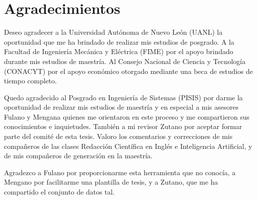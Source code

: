 
\chapter{Agradecimientos}


Deseo agradecer a la Universidad Autónoma de Nuevo León (UANL) la oportunidad que me ha brindado de realizar mis estudios de posgrado. A la Facultad de Ingeniería Mecánica y Eléctrica (FIME) por el apoyo brindado durante mis estudios de maestría. Al Consejo Nacional de Ciencia y Tecnología (CONACYT) por el apoyo e\-co\-nó\-mi\-co otorgado mediante una beca de estudios de tiempo completo.

Quedo agradecido al Posgrado en Ingeniería de Sistemas (PISIS) por darme la oportunidad de realizar mis estudios de maestría y en especial a mis asesores Fulano y Mengana quienes me orientaron en este proceso y me compartieron sus conocimientos e inquietudes. También a mi revisor Zutano por aceptar formar parte del comité de esta tesis. Valoro los comentarios y correcciones de mis compañeros de las clases Redacción Científica en Inglés e Inteligencia Artificial, y de mis compañeros de generación en la maestría.

Agradezco a Fulano por proporcionarme esta herramienta que no conocía, a Mengano por facilitarme una plantilla de tesis, y a Zutano, que me ha compartido el conjunto de datos tal.